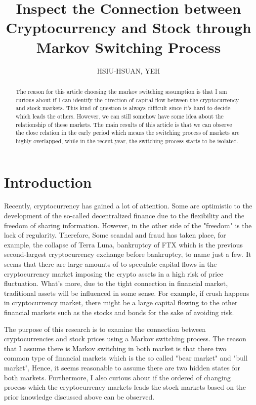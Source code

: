 \documentclass{article}
\title{
    Inspect the Connection between Cryptocurrency and Stock 
    through Markov Switching Process
}
\author{HSIU-HSUAN, YEH}
\begin{document}
\pagestyle{headings}	
\newpage

\maketitle

\begin{abstract}
The reason for this article choosing the markov switching assumption is that I am curious
about if I can identify the direction of capital flow between the cryptocurrency and stock
markets. This kind of question is always difficult since it's hard to decide which leads
the others. However, we can still somehow have some idea about the relationship of these
markets. The main results of this article is that we can observe the close relation in
the early period which means the switching process of markets are highly overlapped, 
while in the recent year, the switching process starts to be isolated. 
\end{abstract}


\section{Introduction}
  Recently, cryptocurrency has gained a lot of attention. Some are optimistic to
the development of the so-called decentralized finance due to the flexibility and 
the freedom of sharing information. However, in the other side of the "freedom"
is the lack of regularity. Therefore, Some scandal and fraud has taken place, for example, the 
collapse of Terra Luna, bankruptcy of FTX which is the previous second-largest 
cryptocurrency exchange before bankruptcy, to name just a few. It seems that there are large amounts
of to speculate capital flows in the cryptocurrency market imposing the crypto assets
in a high risk of price fluctuation. What's more, due to the tight connection in 
financial market, traditional assets will be influenced in some sense. For example,
if crush happens in cryptocurrency market, there might be a large capital flowing
to the other financial markets such as the stocks and bonds for the sake of avoiding
risk.

  The purpose of this research is to examine the connection between cryptocurrencies 
and stock prices using a Markov switching process. The reason that I assume there
is Markov switching in both market is that there two common type of financial markets 
which is the so called "bear market" and "bull market",
Hence, it seems reasonable to assume there are two hidden states for
both markets. Furthermore, I also curious about if the ordered of changing process 
which the cryptocurrency markets leads the stock markets based on the prior knowledge discussed
above can be observed.
\end{document}
